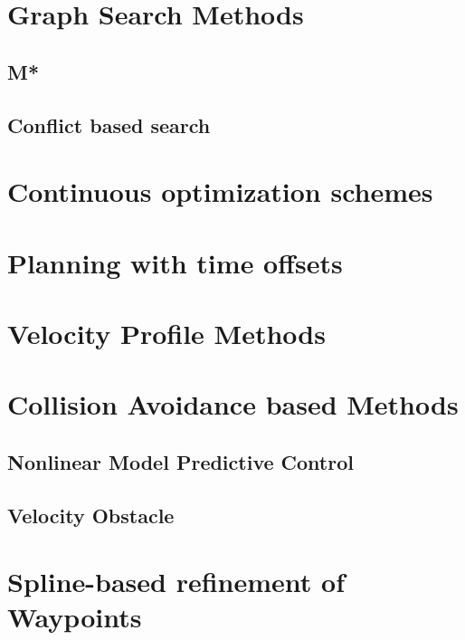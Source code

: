  \section{Graph Search Methods}
 \subsection{M*}
 \subsection{Conflict based search}
 
 \section{Continuous optimization schemes}

 \section{Planning with time offsets}

 \section{Velocity Profile Methods}

 \section{Collision Avoidance based Methods}
 \subsection{Nonlinear Model Predictive Control}
 \subsection{Velocity Obstacle}

 \section{Spline-based refinement of Waypoints}
